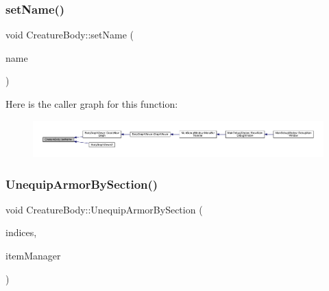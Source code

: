 \subsubsection{\texorpdfstring{set\+Name()}{setName()}}
{\footnotesize\ttfamily void Creature\+Body\+::set\+Name (\begin{DoxyParamCaption}\item[{std\+::string}]{name }\end{DoxyParamCaption})}

Here is the caller graph for this function\+:
\nopagebreak
\begin{figure}[H]
\begin{center}
\leavevmode
\includegraphics[width=350pt]{da/d7d/class_creature_body_a5fa474a4a6f2c04d6ae55db42e6a9c75_icgraph}
\end{center}
\end{figure}
\mbox{\label{class_creature_body_aa923b5ba453a19b651af7290d568a4fc}} 
\subsubsection{\texorpdfstring{Unequip\+Armor\+By\+Section()}{UnequipArmorBySection()}}
{\footnotesize\ttfamily void Creature\+Body\+::\+Unequip\+Armor\+By\+Section (\begin{DoxyParamCaption}\item[{std\+::vector$<$ int $>$ \&}]{indices,  }\item[{\mbox{\hyperlink{class_item_manager}{Item\+Manager}} \&}]{item\+Manager }\end{DoxyParamCaption})}

